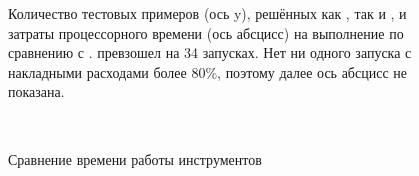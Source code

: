 \begin{figure}
    \pgfplotsset{width=1.\textwidth,height=0.3\textheight}
    \pgfmathsetmacro\NRows{\pgfplotsretval}
        \centering
    \caption{Количество тестовых примеров (ось y), решённых как \theringenCICI{}, так и \racer{}, и затраты процессорного времени (ось абсцисс) на выполнение \theringenCICI{} по сравнению с \racer{}. \racer{} превзошел \theringenCICI{} на 34 запусках. Нет ни одного запуска с накладными расходами более 80\%, поэтому далее ось абсцисс не показана.}
    \label{fig:performance}
\end{figure}

\begin{figure}
~
\caption{Сравнение времени работы инструментов}
\label{fig:toolplot}
\end{figure}

